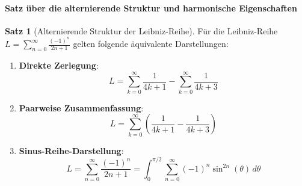 \documentclass[a4paper, 12pt, twoside, openright]{report}
\theoremstyle{definition}
\theoremstyle{definition}
\newtheorem{satz}{Satz}[chapter]
\begin{document}
\paragraph{Satz über die alternierende Struktur und harmonische Eigenschaften}

\begin{satz}[Alternierende Struktur der Leibniz-Reihe]
Für die Leibniz-Reihe $L = \sum_{n=0}^{\infty} \frac{(-1)^n}{2n+1}$ gelten folgende äquivalente Darstellungen:

\begin{enumerate}
\item \textbf{Direkte Zerlegung}: 
\begin{equation}
L = \sum_{k=0}^{\infty} \frac{1}{4k+1} - \sum_{k=0}^{\infty} \frac{1}{4k+3}
\end{equation}

\item \textbf{Paarweise Zusammenfassung}:
\begin{equation}
L = \sum_{k=0}^{\infty} \left( \frac{1}{4k+1} - \frac{1}{4k+3} \right)
\end{equation}

\item \textbf{Sinus-Reihe-Darstellung}:
\begin{equation}
L = \sum_{n=0}^{\infty} \frac{(-1)^n}{2n+1} = \int_0^{\pi/2} \sum_{n=0}^{\infty} (-1)^n \sin^{2n}(\theta) \, d\theta
\end{equation}
\end{enumerate}
\end{satz}
\end{document}
